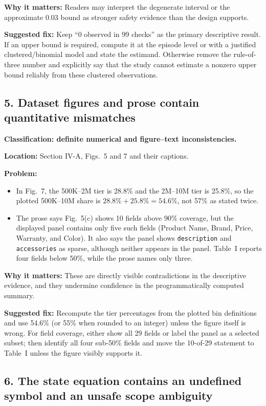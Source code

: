 \documentclass[11pt]{article}
\begin{document}
\textbf{Why it matters:} Readers may interpret the degenerate interval or the approximate 0.03 bound as stronger safety evidence than the design supports.

\textbf{Suggested fix:} Keep ``0 observed in 99 checks'' as the primary descriptive result.  If an upper bound is required, compute it at the episode level or with a justified clustered/binomial model and state the estimand.  Otherwise remove the rule-of-three number and explicitly say that the study cannot estimate a nonzero upper bound reliably from these clustered observations.

\subsection*{5. Dataset figures and prose contain quantitative mismatches}

\textbf{Classification: definite numerical and figure--text inconsistencies.}

\textbf{Location:} Section IV-A, Figs.~5 and 7 and their captions.

\textbf{Problem:}
\begin{itemize}
  \item In Fig.~7, the 500K--2M tier is 28.8\% and the 2M--10M tier is 25.8\%, so the plotted 500K--10M share is $28.8\%+25.8\%=54.6\%$, not 57\% as stated twice.
  \item The prose says Fig.~5(c) shows 10 fields above 90\% coverage, but the displayed panel contains only five such fields (Product Name, Brand, Price, Warranty, and Color).  It also says the panel shows \texttt{description} and \texttt{accessories} as sparse, although neither appears in the panel.  Table~I reports four fields below 50\%, while the prose names only three.
\end{itemize}

\textbf{Why it matters:} These are directly visible contradictions in the descriptive evidence, and they undermine confidence in the programmatically computed summary.

\textbf{Suggested fix:} Recompute the tier percentages from the plotted bin definitions and use 54.6\% (or 55\% when rounded to an integer) unless the figure itself is wrong.  For field coverage, either show all 29 fields or label the panel as a selected subset; then identify all four sub-50\% fields and move the 10-of-29 statement to Table~I unless the figure visibly supports it.

\subsection*{6. The state equation contains an undefined symbol and an unsafe scope ambiguity}
\end{document}
